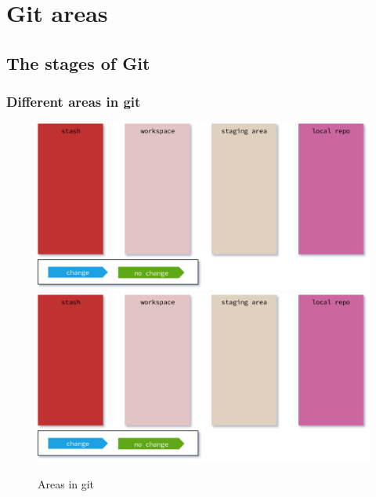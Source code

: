\section{Git areas}
\subsection{The stages of Git}
\begin{frame}[fragile]
    \frametitle{Different areas in git}
    \begin{figure}
        \begin{center}
            {
                \includegraphics[width=1\textwidth,keepaspectratio]{./images/GitAreas.png}
            }
            {
                \includegraphics[height=0.75\textheight,keepaspectratio]{./images/GitAreas.png}
            }
            \caption{Areas in git}
        \end{center}
    \end{figure}
\end{frame}

